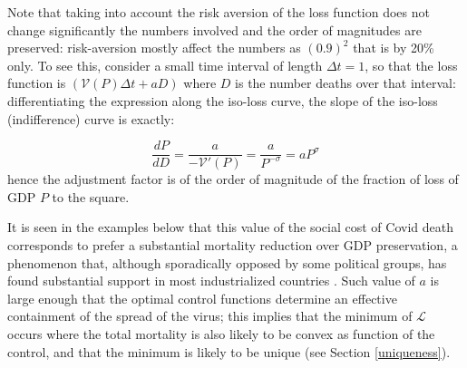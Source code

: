 \documentclass{amsart}
\begin{document}

Note that taking into account the risk aversion of the loss function does not change significantly the numbers involved and the order of magnitudes are preserved: risk-aversion mostly affect the numbers as $(0.9)^2$ that is by 20\% only. To see this, consider a small time interval of length $\Delta t=1$, so that the loss function is $\left(\mathcal{V}(P)\Delta t+aD\right)$ where $D$ is the number deaths over that interval: differentiating the expression along the iso-loss curve, the slope of the iso-loss (indifference) curve is exactly: 

\[
\frac{dP}{dD}=\frac{a}{-\mathcal{V}'(P)}=\frac{a}{P^{-\sigma}}=aP^{\sigma}
\]
 hence the adjustment factor is of the order of magnitude of the fraction of loss of  GDP $P$ to the square.

It is seen in the examples below that this value of the
social cost of Covid death corresponds to prefer a substantial
mortality reduction over GDP preservation, a phenomenon that, although
sporadically opposed by some political groups, has found
substantial support in most industrialized countries
\cite{Hart}.
Such value of $a$ is large enough that the optimal control functions
determine an effective containment of the spread of the
virus; this implies that the minimum of $\mathcal L$ occurs
where the total mortality is also likely to be convex as
function of the control, and
that the minimum is likely to be unique (see Section
\ref{uniqueness}). 

\vskip 0.5cm
\end{document}
